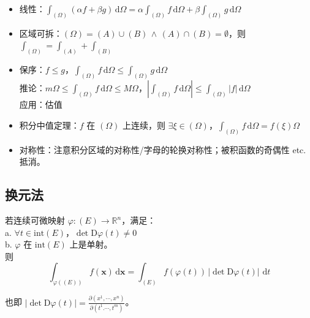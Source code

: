 \documentclass[12pt, a4paper, UTF8, openany]{ctexbook}
\newcommand{\dif}{\mathrm{d}}
\newcommand{\Dif}{\mathrm{D}}
\newcommand{\sdif}{\,\dif}
\newcommand{\field}[1]{\mathbb{#1}}%
\newcommand{\mat}[1]{\mathbf{#1}}
\begin{document}
        \begin{itemize}
            \item 线性：$\int_{(\Omega)} (\alpha f + \beta g) \sdif \Omega = \alpha \int_{(\Omega)} f \sdif \Omega + \beta \int_{(\Omega)} g \sdif \Omega$
            \item 区域可拆：$(\Omega) = (A) \cup (B) \,\land\, (A) \cap (B) = \emptyset$，则 $\int_{(\Omega)} = \int_{(A)} + \int_{(B)}$
            \item 保序：$f \leqslant g$，$\int_{(\Omega)} f \sdif\Omega \leqslant \int_{(\Omega)} g \sdif\Omega$ \\
                推论：$m \Omega \leqslant \int_{(\Omega)} f\sdif\Omega \leqslant M\Omega$，$|\int_{(\Omega)} f\sdif\Omega| \leqslant \int_{(\Omega)} |f|\sdif\Omega$ \\
                {\heiti 应用}：估值
            \item 积分中值定理：$f$ 在 $(\Omega)$ 上连续，则 $\exists \xi \in (\Omega)$，$\int_{(\Omega)} f\sdif\Omega = f(\xi)\Omega$
            \item {\heiti 对称性}：注意积分区域的对称性/字母的轮换对称性；被积函数的奇偶性 etc. 抵消。
        \end{itemize}

        \subsection{换元法}
        若连续可微映射 $\varphi: (E) \to \field{R}^n$，满足：\\
        a. $\forall t \in \text{int}(E)$，$\det \Dif \varphi(t) \neq 0$ \\
        b. $\varphi$ 在 $\text{int}(E)$ 上是单射。\\
        则
        $$\int_{\varphi((E))} f(\mat{x})\sdif\mat{x} = \int_{(E)} f(\varphi(t)) \,|\det \Dif \varphi(t)|\, \sdif t$$

        也即 $|\det \Dif \varphi(t)| = \frac{\partial(x^1, \cdots, x^n)}{\partial (t^1. \cdots, t^m)}$。
\end{document}
